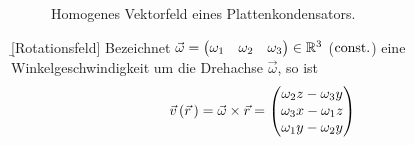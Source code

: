 \documentclass[12pt]{article}
\begin{document}
\def\dph{0.3} %
\def\dpw{0.1} %
\def\dipole#1{
    \begin{scope}[shift={(#1)}]
        \draw[charge-] (-\dph,0) to[out=90,in=180] (0,\dpw) -- (0,-\dpw) to[out=180,in=-90] cycle;
        \draw[charge+] ( \dph,0) to[out=90,in=0] (0,\dpw) -- (0,-\dpw) to[out=  0,in=-90] cycle;
        \node[scale=0.7] at (-\dph/2,0) {$-$};
        \node[scale=0.7] at ( \dph/2,0) {$+$};
    \end{scope}
}

\def\height{5}
\def\width{3}
\def\platewidth{0.5}
\def\dielwidth{0.13*\width}
\def\nfieldlines{20}
\def\ncharges{7}

\begin{figure}[htbp!]
    \centering
    \caption{Homogenes Vektorfeld eines Plattenkondensators.}
\end{figure}

\begin{defn}{\b{[Rotationsfeld]}} Bezeichnet $\vec{\omega}=\begin{pmatrix}
            \omega_1 & \omega_2 & \omega_3
        \end{pmatrix}\in\mathbb{R}^3$ ($\mathrm{const}.$) eine Winkelgeschwindigkeit um die Drehachse $\vec{\omega}$,
    so ist
    \begin{align}
        \vec{v}\,(\vec{r}\,)=\vec{\omega}\times\vec{r}=\begin{pmatrix}
                                                \omega_2 z -\omega_3 y \\
                                                \omega_3 x-\omega_1 z  \\
                                                \omega_1 y-\omega_2 y
                                            \end{pmatrix}
    \end{align}
\end{defn}
\end{document}
